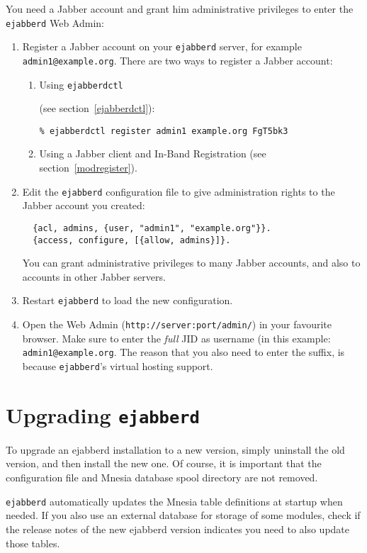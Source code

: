 \documentclass[a4paper,10pt]{book}
\newcommand{\ind}[1]{\begin{latexonly}\index{#1}\end{latexonly}}
\newcommand{\jid}[1]{\texttt{#1}}
\newcommand{\term}[1]{\texttt{#1}}
\newcommand{\ejabberd}{\texttt{ejabberd}}
\begin{document}
You need a Jabber account and grant him administrative privileges
to enter the \ejabberd{} Web Admin:
\begin{enumerate}
\item Register a Jabber account on your \ejabberd{} server, for example \term{admin1@example.org}. 
  There are two ways to register a Jabber account:
  \begin{enumerate}
  \item Using \term{ejabberdctl}\ind{ejabberdctl} (see section~\ref{ejabberdctl}):
    \begin{verbatim}
% ejabberdctl register admin1 example.org FgT5bk3
\end{verbatim} 
  \item Using a Jabber client and In-Band Registration (see section~\ref{modregister}).
  \end{enumerate}
\item Edit the \ejabberd{} configuration file to give administration rights to the Jabber account you created:
  \begin{verbatim}
  {acl, admins, {user, "admin1", "example.org"}}.
  {access, configure, [{allow, admins}]}.
\end{verbatim} 
  You can grant administrative privileges to many Jabber accounts,
  and also to accounts in other Jabber servers.
\item Restart \ejabberd{} to load the new configuration.
\item Open the Web Admin (\verb|http://server:port/admin/|) in your
  favourite browser. Make sure to enter the \emph{full} JID as username (in this
  example: \jid{admin1@example.org}. The reason that you also need to enter the
  suffix, is because \ejabberd{}'s virtual hosting support.
\end{enumerate}

\section{Upgrading \ejabberd{}}

To upgrade an ejabberd installation to a new version,
simply uninstall the old version, and then install the new one.
Of course, it is important that the configuration file 
and Mnesia database spool directory are not removed.

\ejabberd{} automatically updates the Mnesia table definitions at startup when needed.
If you also use an external database for storage of some modules,
check if the release notes of the new ejabberd version
indicates you need to also update those tables.
\end{document}

